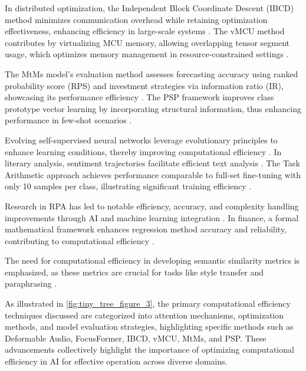 In distributed optimization, the Independent Block Coordinate Descent (IBCD) method minimizes communication overhead while retaining optimization effectiveness, enhancing efficiency in large-scale systems \cite{mishchenko201999distributedoptimizationwaste}. The vMCU method contributes by virtualizing MCU memory, allowing overlapping tensor segment usage, which optimizes memory management in resource-constrained settings \cite{zheng2024vmcucoordinatedmemorymanagement}.

The MtMs model's evaluation method assesses forecasting accuracy using ranked probability score (RPS) and investment strategies via information ratio (IR), showcasing its performance efficiency \cite{stank2024designingtimeseriesmodelshypernetworks}. The PSP framework improves class prototype vector learning by incorporating structural information, thus enhancing performance in few-shot scenarios \cite{ge2024psppretrainingstructureprompt}.

Evolving self-supervised neural networks leverage evolutionary principles to enhance learning conditions, thereby improving computational efficiency \cite{le2019evolvingselfsupervisedneuralnetworks}. In literary analysis, sentiment trajectories facilitate efficient text analysis \cite{jannidis2016analyzingfeaturesdetectionhappy}. The Task Arithmetic approach achieves performance comparable to full-set fine-tuning with only 10 samples per class, illustrating significant training efficiency \cite{chitale2023taskarithmeticloracontinual}.

Research in RPA has led to notable efficiency, accuracy, and complexity handling improvements through AI and machine learning integration \cite{pandy2024advancementsroboticsprocessautomation}. In finance, a formal mathematical framework enhances regression method accuracy and reliability, contributing to computational efficiency \cite{kun2022mathematicalfoundationsregressionmethods}.

The need for computational efficiency in developing semantic similarity metrics is emphasized, as these metrics are crucial for tasks like style transfer and paraphrasing \cite{yamshchikov2020styletransferparaphraselookingsensible}. 

As illustrated in \autoref{fig:tiny_tree_figure_3}, the primary computational efficiency techniques discussed are categorized into attention mechanisms, optimization methods, and model evaluation strategies, highlighting specific methods such as Deformable Audio, FocusFormer, IBCD, vMCU, MtMs, and PSP. These advancements collectively highlight the importance of optimizing computational efficiency in AI for effective operation across diverse domains.


